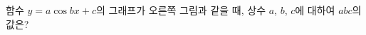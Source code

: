 \noindent\begin{minipage}[t]{0.58\linewidth}\vspace{0pt}\raggedright 함수 $y=a\cos bx+c$의 그래프가 오른쪽 그림과 같을 때, 상수 $a$, $b$, $c$에 대하여 $abc$의 값은? \end{minipage}\hfill\begin{minipage}[t]{0.4\linewidth}\vspace{0pt}\centering \resizebox{\ifdim\width>\linewidth\linewidth\else\width\fi}{!}{}\end{minipage}\par
\dmchoicesauto{}{$-4\pi$}{$-2\pi$}{$-\pi$}{$\pi$}{$2\pi$}
